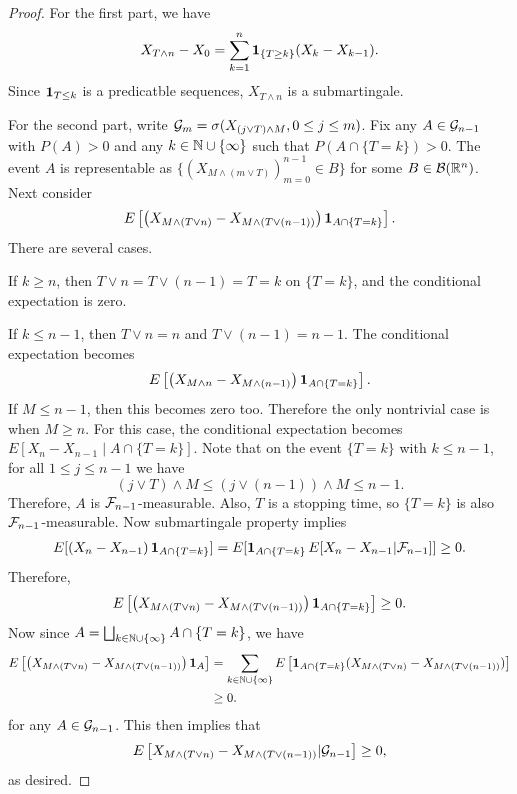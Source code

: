 \documentclass[a4paper]{article}
\begin{document}
\begin{proof}
  For the first part, we have
  \[
    X_{T \wedge n} - X_0 = \sum_{k=1}^n \operatorname{\mathbf{1}}_{\{T \geq k\}} (X_k - X_{k - 1}).
  \]
  Since $\operatorname{\mathbf{1}}_{T \leq k}$ is a predicatble sequences, $X_{T \wedge n}$
  is a submartingale.

  For the second part, write $\mathcal{G}_{m} = \sigma (X_{(j \vee T) \wedge M},
    0 \leq j \leq m)$. Fix any $A \in \mathcal{G}_{n-1}$ with $P(A) > 0$ and
  any $k \in \mathbb{N} \cup \{\infty\}$ such that $P(A \cap \{T = k\}) > 0$.
  The event $A$ is representable as
  $\{ (X_{M \wedge (m \vee T)})_{m=0}^{n - 1} \in B \}$ for some
  $B \in \mathcal{B}(\mathbb{R}^n)$. Next consider
  \begin{align*}
    E \left[ \left( X_{M \wedge (T \vee n)} - X_{M \wedge (T \vee (n - 1))} \right)
        \operatorname{\mathbf{1}}_{ A \cap \{T = k\} } \right].
  \end{align*}
  There are several cases.

  If $k \geq n$, then $T \vee n = T \vee (n - 1) = T = k$
  on $\{T = k\}$, and the conditional expectation is zero.

  If $k \leq n - 1$, then $T \vee n = n$ and $T \vee (n - 1) = n - 1$.
  The conditional expectation becomes
  \[
    E \left[ \left( X_{M \wedge n} - X_{M \wedge (n - 1)} \right)
      \operatorname{\mathbf{1}}_{ A \cap \{T = k\} } \right].
  \]
  If $M \leq n - 1$, then this becomes zero too. Therefore the only
  nontrivial case is when $M \geq n$. For this case, the conditional
  expectation becomes $E [X_n - X_{n - 1} \mid A \cap \{ T = k \}]$.
  Note that on the event $\{ T = k \}$ with $k \leq n - 1$,
  for all $1 \leq j \leq n - 1$ we have
  \[
    (j \vee T) \wedge M \leq (j \vee (n - 1)) \wedge M \leq n - 1.
  \]
  Therefore, $A$ is
  $\mathcal{F}_{n - 1}$-measurable. Also, $T$ is a stopping time, so
  $\{ T = k \}$ is also $\mathcal{F}_{n - 1}$-measurable. Now
  submartingale property implies
  \begin{align*}
    E [\left( X_n - X_{n - 1} \right) \operatorname{\mathbf{1}}_{A \cap \{ T = k \}}]
    = E [\operatorname{\mathbf{1}}_{A \cap \{T = k\}} E[X_n - X_{n - 1} | \mathcal{F}_{n - 1}]]
    \geq 0.
  \end{align*}
  Therefore,
  \[
    E \left[ \left( X_{M \wedge (T \vee n)} - X_{M \wedge (T \vee (n - 1))} \right)
      \operatorname{\mathbf{1}}_{A \cap \{T = k\}} \right] \geq 0.
  \]
  Now since $A = \bigsqcup_{k \in \mathbb{N} \cup \{\infty\}} A \cap \{T = k\}$,
  we have
  \begin{align*}
    E \left[ \left( X_{M \wedge (T \vee n)} - X_{M \wedge (T \vee (n - 1))} \right)
        \operatorname{\mathbf{1}}_A \right]
     & = \sum_{k \in \mathbb{N} \cup \{\infty\}}
    E \left[ \operatorname{\mathbf{1}}_{A \cap \{T = k\}} (X_{M \wedge (T \vee n)} - X_{M \wedge (T \vee (n - 1))})
        \right] \\
     & \geq 0.
  \end{align*}
  for any $A \in \mathcal{G}_{n - 1}$. This then implies that
  \[
    E \left[ X_{M \wedge (T \vee n)} - X_{M \wedge (T \vee (n - 1))}
      | \mathcal{G}_{n - 1} \right] \geq 0,
  \]
  as desired.
\end{proof}
\end{document}
